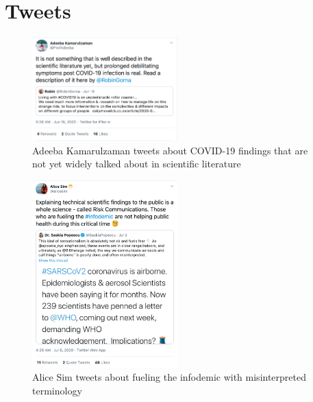 \documentclass[acmsmall,authordraft]{acmart}
\begin{document}



\appendix
\section{Tweets}

\begin{figure}
  \includegraphics[width=0.5\textwidth]{Pictures/Appendix_Tweets/adeeba kamarulzaman tweet.png}
  \caption{Adeeba Kamarulzaman tweets about COVID-19 findings that are not yet widely talked about in scientific literature}
  \label{adeeba_kamarulzaman_tweet}
\end{figure}

\begin{figure}
  \includegraphics[width=0.5\textwidth]{Pictures/Appendix_Tweets/alice sim tweet.png}
  \caption{Alice Sim tweets about fueling the infodemic with misinterpreted terminology}
  \label{alice_sim_tweet}
\end{figure}
\end{document}
